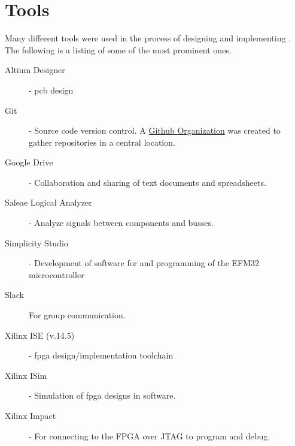 \chapter{Tools}

Many different tools were used in the process of designing and implementing \vthreek.
The following is a listing of some of the most prominent ones.

\begin{description}
    \item[Altium Designer] - \gls{pcb} design
    \item[Git] - Source code version control. A \href{https://github.com/DMPRO-2015-vector-graphics}{Github Organization} was created to gather repositories in a central location.
    \item[Google Drive] - Collaboration and sharing of text documents and spreadsheets.
    \item[Saleae Logical Analyzer] - Analyze signals between components and busses.
    \item[Simplicity Studio] - Development of software for and programming of the EFM32 microcontroller
    \item[Slack] For group communication.
    \item[Xilinx ISE (v.14.5)] - \gls{fpga} design/implementation toolchain
    \item[Xilinx ISim] - Simulation of \gls{fpga} designs in software.
    \item[Xilinx Impact] - For connecting to the FPGA over JTAG to program and debug.
\end{description}
